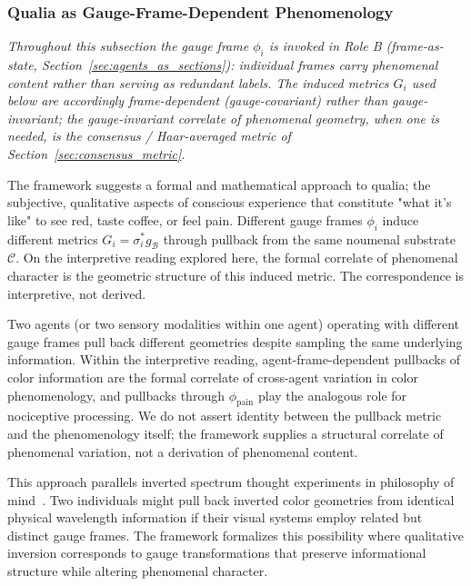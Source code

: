 \documentclass[11pt]{article}
\begin{document}
\subsubsection{Qualia as Gauge-Frame-Dependent Phenomenology}
\label{sec:qualia}

\emph{Throughout this subsection the gauge frame $\phi_i$ is invoked in Role B (frame-as-state, Section~\ref{sec:agents_as_sections}): individual frames carry phenomenal content rather than serving as redundant labels. The induced metrics $G_i$ used below are accordingly frame-dependent (gauge-covariant) rather than gauge-invariant; the gauge-invariant correlate of phenomenal geometry, when one is needed, is the consensus / Haar-averaged metric of Section~\ref{sec:consensus_metric}.}

The framework suggests a formal and mathematical approach to qualia; the subjective, qualitative aspects of conscious experience that constitute "what it's like" to see red, taste coffee, or feel pain. Different gauge frames $\phi_i$ induce different metrics $G_i = \sigma_i^* g_{\mathcal{B}}$ through pullback from the same noumenal substrate $\mathcal{C}$. On the interpretive reading explored here, the formal correlate of phenomenal character is the geometric structure of this induced metric. The correspondence is interpretive, not derived.

Two agents (or two sensory modalities within one agent) operating with different gauge frames pull back different geometries despite sampling the same underlying information. Within the interpretive reading, agent-frame-dependent pullbacks of color information are the formal correlate of cross-agent variation in color phenomenology, and pullbacks through $\phi_{\text{pain}}$ play the analogous role for nociceptive processing. We do not assert identity between the pullback metric and the phenomenology itself; the framework supplies a structural correlate of phenomenal variation, not a derivation of phenomenal content.

This approach parallels inverted spectrum thought experiments in philosophy of mind~\cite{Shoemaker1982}. Two individuals might pull back inverted color geometries from identical physical wavelength information if their visual systems employ related but distinct gauge frames. The framework formalizes this possibility where qualitative inversion corresponds to gauge transformations that preserve informational structure while altering phenomenal character.
\end{document}
